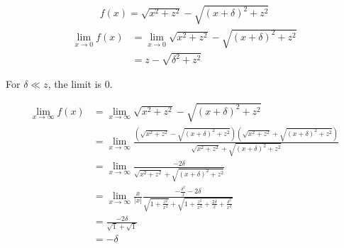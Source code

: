 \begin{align}
 f(x)=\sqrt{x^2+z^2}-\sqrt{\left(x+\delta\right)^2+z^2}
\end{align}
\begin{align}
 \lim_{x \to 0} f(x)
 &= \lim_{x \to 0} \sqrt{x^2+z^2}-\sqrt{\left(x+\delta\right)^2+z^2} \\
 &= z-\sqrt{\delta^2+z^2}
\end{align}

For $\delta \ll z$, the limit is $0$.

\begin{align}
 \lim_{x \to \infty}f(x)
 &=\lim_{x \to \infty}\sqrt{x^2+z^2}-\sqrt{(x+\delta)^2+z^2} \\
 &= \lim_{x \to \infty}\frac{\left(\sqrt{x^2+z^2}-\sqrt{\left(x+\delta\right)^2+z^2}\right)\left(\sqrt{x^2+z^2}+\sqrt{\left(x+\delta\right)^2+z^2}\right)}
 {\sqrt{x^2+z^2}+\sqrt{\left(x+\delta\right)^2+z^2}}\\
 &= \lim_{x \to \infty}\frac{-2\delta}
 {\sqrt{x^2+z^2}+\sqrt{\left(x+\delta\right)^2+z^2}}\\
 &=\lim_{x \to \infty}\frac{x}{|x|}\frac{-\frac{\delta^2}{x}-2\delta}
 {\sqrt{1+\frac{z^2}{x^2}}+\sqrt{1+\frac{z^2}{x^2}+\frac{2\delta}{x}+\frac{\delta^2}{x^2}}}\\
 &=\frac{-2\delta}{\sqrt{1}+\sqrt{1}}\\
 &=-\delta
\end{align}

